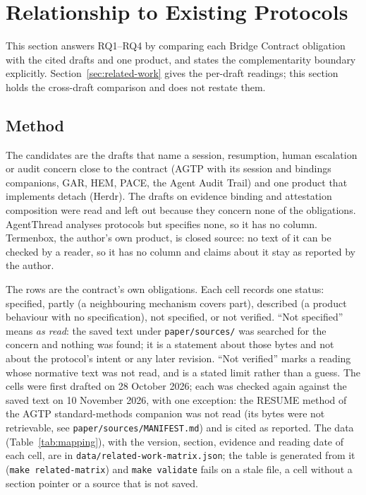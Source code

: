 \section{Relationship to Existing Protocols}
\label{sec:mapping}

This section answers RQ1--RQ4 by comparing each Bridge Contract
obligation with the cited drafts and one product, and states the
complementarity boundary explicitly. Section~\ref{sec:related-work} gives
the per-draft readings; this section holds the cross-draft comparison and
does not restate them.

\subsection{Method}\label{sec:comparison-method}

The candidates are the drafts that name a session, resumption, human
escalation or audit concern close to the contract (AGTP with its session
and bindings companions, GAR, HEM, PACE, the Agent Audit Trail) and one
product that implements detach (Herdr). The drafts on evidence binding and
attestation composition were read and left out because they concern none of
the obligations. AgentThread analyses protocols but specifies none, so it
has no column. Termenbox, the author's own product, is closed source: no text
of it can be checked by a reader, so it has no column and claims about it stay
as reported by the author.

The rows are the contract's own obligations. Each cell records one status:
specified, partly (a neighbouring mechanism covers part),
described (a product behaviour with no specification), not specified, or
not verified. ``Not specified'' means \emph{as read}: the saved text
under \texttt{paper/sources/} was searched for the concern and nothing was
found; it is a statement about those bytes and not about the protocol's
intent or any later revision. ``Not verified'' marks a reading whose
normative text was not read, and is a stated limit rather than a guess. The
cells were first drafted on 28 October 2026; each was checked again
against the saved text on 10 November 2026, with one exception: the RESUME
method of the AGTP standard-methods companion was not read (its bytes were not
retrievable, see \texttt{paper/sources/MANIFEST.md}) and is cited as reported. The data (Table~\ref{tab:mapping}), with the version, section,
evidence and reading date of each cell, are in
\texttt{data/related-work-matrix.json}; the table is generated from it
(\texttt{make related-matrix}) and \texttt{make validate} fails on a stale
file, a cell without a section pointer or a source that is not saved.

